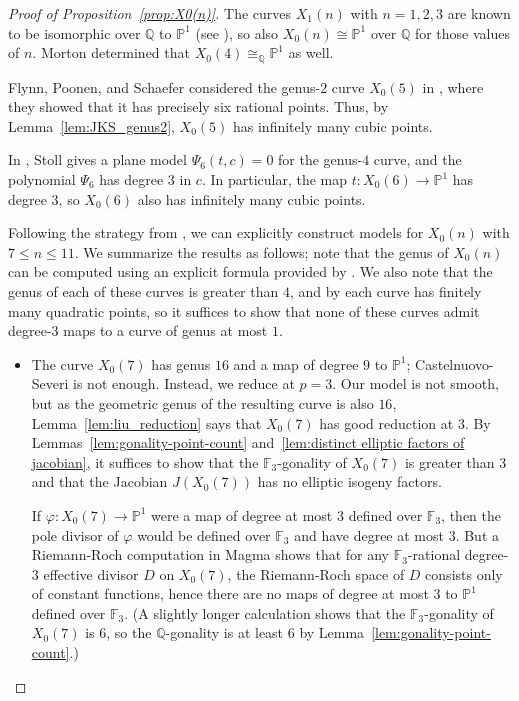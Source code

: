 \documentclass[12pt]{amsart}
\theoremstyle{definition}
\newcommand{\bbF}{\mathbb{F}}
\newcommand{\bbP}{\mathbb{P}}
\newcommand{\bbQ}{\mathbb{Q}}
\numberwithin{equation}{section}
\begin{document}
\begin{proof}[Proof of Proposition~\ref{prop:X0(n)}]
    The curves $X_1(n)$ with $n = 1,2,3$ are known to be isomorphic over $\bbQ$ to $\bbP^1$ (see \cite{walde/russo:1994}), so also $X_0(n) \cong \bbP^1$ over $\bbQ$ for those values of $n$. Morton \cite{morton:1998} determined that $X_0(4) \cong_\bbQ \bbP^1$ as well.

    Flynn, Poonen, and Schaefer considered the genus-$2$ curve $X_0(5)$ in \cite{flynn/poonen/schaefer:1997}, where they showed that it has precisely six rational points. Thus, by Lemma~\ref{lem:JKS_genus2}, $X_0(5)$ has infinitely many cubic points.

    In \cite[p. 369]{stoll:2008}, Stoll gives a plane model $\Psi_6(t,c) = 0$ for the genus-$4$ curve, and the polynomial $\Psi_6$ has degree $3$ in $c$. In particular, the map $t : X_0(6)\to\bbP^1$ has degree $3$, so $X_0(6)$ also has infinitely many cubic points.

    Following the strategy from \cite{stoll:2008}, we can explicitly construct models for $X_0(n)$ with $7 \le n \le 11$. We summarize the results as follows; note that the genus of $X_0(n)$ can be computed using an explicit formula provided by \cite[Theorem C]{morton:1996}. We also note that the genus of each of these curves is greater than $4$, and by \cite[Proposition 4.5]{doyle/krumm:2024} each curve has finitely many quadratic points, so it suffices to show that none of these curves admit degree-$3$ maps to a curve of genus at most $1$.
    \begin{itemize}
        \item The curve $X_0(7)$ has genus $16$ and a map of degree $9$ to $\bbP^1$; Castelnuovo-Severi is not enough. Instead, we reduce at $p=3$. Our model is not smooth, but as the geometric genus of the resulting curve is also $16$, Lemma~\ref{lem:liu_reduction} says that $X_0(7)$ has good reduction at $3$. By Lemmas~\ref{lem:gonality-point-count} and~\ref{lem:distinct elliptic factors of jacobian}, it suffices to show that the $\bbF_3$-gonality of $X_0(7)$ is greater than $3$ and that the Jacobian $J(X_0(7))$ has no elliptic isogeny factors.
        
        If $\varphi : X_0(7) \to \bbP^1$ were a map of degree at most $3$ defined over $\bbF_3$, then the pole divisor of $\varphi$ would be defined over $\bbF_3$ and have degree at most $3$. But a Riemann-Roch computation in Magma shows that for any $\bbF_3$-rational degree-$3$ effective divisor $D$ on $X_0(7)$, the Riemann-Roch space of $D$ consists only of constant functions, hence there are no maps of degree at most $3$ to $\bbP^1$ defined over $\bbF_3$. (A slightly longer calculation shows that the $\bbF_3$-gonality of $X_0(7)$ is $6$, so the $\bbQ$-gonality is at least $6$ by Lemma~\ref{lem:gonality-point-count}.)
        

\end{itemize}
\end{proof}
\end{document}
